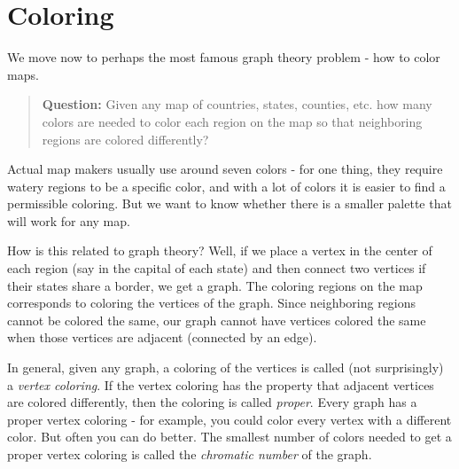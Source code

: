 \documentclass[12pt]{article}
\begin{document}
\section{Coloring}

We move now to perhaps the most famous graph theory problem - how to color maps.  

\begin{quote}
  {\bf Question:} Given any map of countries, states, counties, etc. how many colors are needed to color each region on the map so that neighboring regions are colored differently?
\end{quote}

Actual map makers usually use around seven colors - for one thing, they require watery regions to be a specific color, and with a lot of colors it is easier to find a permissible coloring.  But we want to know whether there is a smaller palette that will work for any map.

How is this related to graph theory?  Well, if we place a vertex in the center of each region (say in the capital of each state) and then connect two vertices if their states share a border, we get a graph.  The coloring regions on the map corresponds to coloring the vertices of the graph.  Since neighboring regions cannot be colored the same, our graph cannot have vertices colored the same when those vertices are adjacent (connected by an edge).

In general, given any graph, a coloring of the vertices is called (not surprisingly) a {\em vertex coloring}.  If the vertex coloring has the property that adjacent vertices are colored differently, then the coloring is called {\em proper}.  Every graph has a proper vertex coloring - for example, you could color every vertex with a different color.  But often you can do better.  The smallest number of colors needed to get a proper vertex coloring is called the {\em chromatic number} of the graph.
\end{document}
